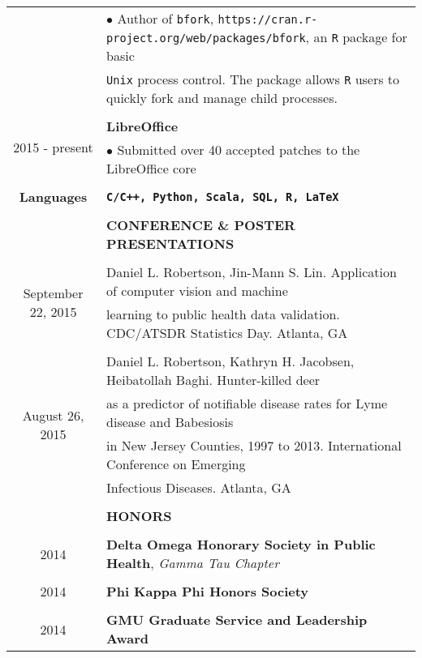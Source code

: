 \documentclass[10pt]{article}
\begin{document}
\begin{table}[ht]
\begin{tabular}{@{\hspace{0mm}}c@{\hspace{1mm}}c@{\hspace{3mm}}cl}
            & & & $\bullet$ Author of \texttt{bfork}, \texttt{https://cran.r-project.org/web/packages/bfork}, an \texttt{R} package for basic\\
            & & & \hspace*{3mm}\texttt{Unix} process control. The package allows \texttt{R} users to quickly fork and manage child processes.\\
            \\
            \multicolumn{3}{c}{\multirow{2}{*}{2015 - present}} & \textbf{LibreOffice}\\
            & & & $\bullet$ Submitted over 40 accepted patches to the LibreOffice core\\
            \\
            \multicolumn{3}{c}{\textbf{Languages}} & \textbf{\texttt{C/C++, Python, Scala, SQL, R, \LaTeX}}\\
            & & & \color{maroon}{\rule{14cm}{0.75pt}}\\
            & & & \large{\textbf{CONFERENCE \& POSTER PRESENTATIONS}}\\
            & & & \color{maroon}{\rule{14cm}{0.75pt}}\\
            \multicolumn{3}{c}{\multirow{2}{*}{September 22, 2015}} & Daniel L. Robertson, Jin-Mann S. Lin. Application of computer vision and machine\\
            & & & learning to public health data validation. CDC/ATSDR Statistics Day. Atlanta, GA\\
            \\
            \multicolumn{3}{c}{\multirow{4}{*}{August 26, 2015}} & Daniel L. Robertson, Kathryn H. Jacobsen, Heibatollah Baghi. Hunter-killed deer\\
            & & & as a predictor of notifiable disease rates for Lyme disease and Babesiosis\\
            & & & in New Jersey Counties, 1997 to 2013. International Conference on Emerging\\
            & & & Infectious Diseases. Atlanta, GA\\
            & & & \color{maroon}{\rule{14cm}{0.75pt}}\\
            & & & \large{\textbf{HONORS}}\\
            & & & \color{maroon}{\rule{14cm}{0.75pt}}\\
            \multicolumn{3}{c}{2014} & \textbf{Delta Omega Honorary Society in Public Health}, \textit{Gamma Tau Chapter}\\
            \\
            \multicolumn{3}{c}{2014} & \textbf{Phi Kappa Phi Honors Society}\\
            \\
            \multicolumn{3}{c}{2014} & \textbf{GMU Graduate Service and Leadership Award}\\
        \end{tabular}
    \end{table}
\end{document}
